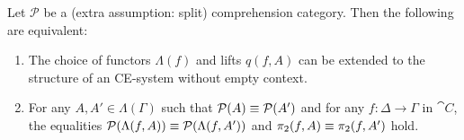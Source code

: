 \begin{comment}
\begin{defn}
Let $f_0\defeq f:\Delta\to\Gamma$ be a morphism of $\cat{C}$, the base category of a
split comprehension category $\mathcal{P}$ which a choice $j$ of cartesian lifts.
By induction we define an element $\Lambda(f,A)\in\Lambda(\Delta)$ together with
a morphism $q(f,A):\mathrm{dom}(\mathcal{P}(\Lambda(f,A)))\to 
\mathrm{dom}(\mathcal{P}(A))$, for any $A\jdeq (A_1,\ldots,A_n) 
\in\Lambda(\Gamma)$.

For $n\jdeq 0$, i.e.~if $A$ is the empty sequence, we let $\Lambda(f,A)$ be the 
empty sequence, and $q(f,A) \jdeq f$. For the inductive step, consider a 
sequence $A_1,\ldots,A_{n+1}\in \Lambda(\Gamma)$. Then we define
\begin{align*}
\Lambda(f,A) & \jdeq \mathrm{dom}(j(A_{n+1},q(f,(A_1,\ldots,A_n))))
\intertext{and}
q(f,A) & \jdeq \mathrm{dom}(\mathcal{P}(j(A_{n+1},q(f,(A_1,\ldots,A_n)))))
\end{align*}
where we consider in the definition of $q(f,A)$, $\mathrm{dom}$ to be the 
domain functor from $\cat{C}^{\to}\to\cat{C}$. 
\end{defn}

\begin{rmk}
It follows immediately from the definition of comprehension categories and the
pasting lemma of pullbacks, that the square
\begin{equation*}
\begin{tikzcd}[column sep=large]
\mathrm{dom}(\mathcal{P}(\Lambda(f,A))) \arrow[r,"{q(f,A)}"] \arrow[d,swap,"{\mathcal{P}(\Lambda(f,A))}"] & \mathrm{dom}(\mathcal{P}(A)) \arrow[d,"{\mathcal{P}(A)}"] \\
\Delta \arrow[r,"f"] & \Gamma
\end{tikzcd}
\end{equation*}
is a pullback square.
\end{rmk}
\end{comment}

\begin{thm}
Let $\mathcal{P}$ be a (extra assumption: split) comprehension category. Then the following are equivalent:
\begin{enumerate}
\item The choice of functors $\Lambda(f)$ and lifts $q(f,A)$ can be extended to the 
structure of an CE-system without empty context.
\item For any
$A,A'\in\Lambda(\Gamma)$ such that $\mathcal{P}(A)\equiv\mathcal{P}(A')$
and for any $f:\Delta\to\Gamma$ in $\cat{C}$, the equalities
$\mathcal{P}(\Lambda(f,A))\equiv\mathcal{P}(\Lambda(f,A'))$ and
$\pi_2(f,A)\equiv\pi_2(f,A')$ hold. 
\end{enumerate}
\end{thm}


